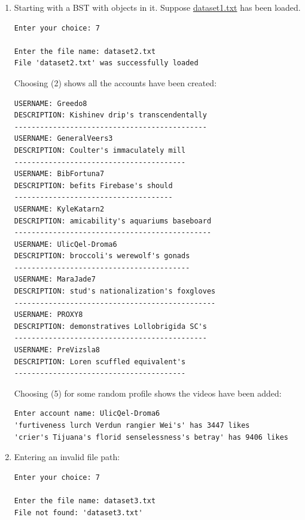 \documentclass{assignment}
\begin{document}
\begin{enumerate}
\begin{enumerate}
    \item Starting with a BST with objects in it. Suppose \underline{dataset1.txt} has been loaded.

\begin{center} \small { \color{gray}
\begin{BVerbatim} 
Enter your choice: 7

Enter the file name: dataset2.txt
File 'dataset2.txt' was successfully loaded
\end{BVerbatim} 
}
\end{center} \color{black}
Choosing (2) shows all the accounts have been created:

\begin{center} \small { \color{gray}
\begin{BVerbatim}
USERNAME: Greedo8
DESCRIPTION: Kishinev drip's transcendentally
---------------------------------------------
USERNAME: GeneralVeers3
DESCRIPTION: Coulter's immaculately mill
----------------------------------------
USERNAME: BibFortuna7
DESCRIPTION: befits Firebase's should
-------------------------------------
USERNAME: KyleKatarn2
DESCRIPTION: amicability's aquariums baseboard
----------------------------------------------
USERNAME: UlicQel-Droma6
DESCRIPTION: broccoli's werewolf's gonads
-----------------------------------------
USERNAME: MaraJade7
DESCRIPTION: stud's nationalization's foxgloves
-----------------------------------------------
USERNAME: PROXY8
DESCRIPTION: demonstratives Lollobrigida SC's
---------------------------------------------
USERNAME: PreVizsla8
DESCRIPTION: Loren scuffled equivalent's
----------------------------------------
\end{BVerbatim}
}
\end{center} \color{black}
Choosing (5) for some random profile shows the videos have been added:
\begin{center} \small { \color{gray}

\begin{BVerbatim}
Enter account name: UlicQel-Droma6
'furtiveness lurch Verdun rangier Wei's' has 3447 likes
'crier's Tijuana's florid senselessness's betray' has 9406 likes
\end{BVerbatim} 

} \end{center} \color{black}

   

    \item Entering an invalid file path:
\begin{center} \small { \color{gray}
\begin{BVerbatim} 
Enter your choice: 7

Enter the file name: dataset3.txt
File not found: 'dataset3.txt'
\end{BVerbatim} 
} \end{center} \color{black}

\end{enumerate}

\end{enumerate}
\end{document}
